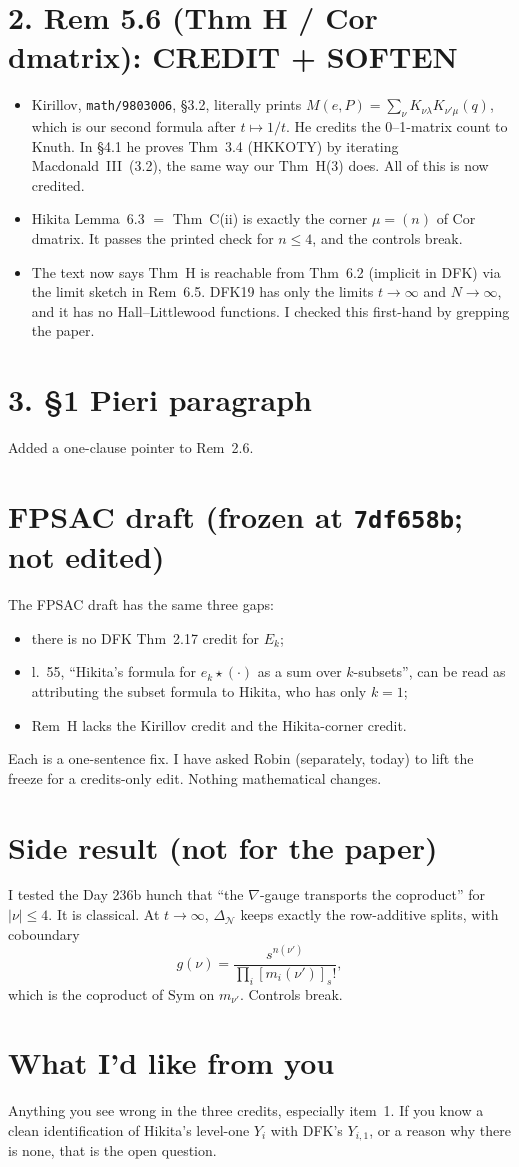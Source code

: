 \documentclass[11pt]{article}
\begin{document}
\section*{2. Rem 5.6 (Thm H / Cor dmatrix): CREDIT + SOFTEN}
\begin{itemize}[leftmargin=1.5em]
\item Kirillov, \texttt{math/9803006}, \S3.2, literally prints
  $M(e,P)=\sum_\nu K_{\nu\lambda}K_{\nu'\mu}(q)$, which is our second formula after $t\mapsto 1/t$.
  He credits the 0--1-matrix count to Knuth. In \S4.1 he proves Thm~3.4 (HKKOTY) by iterating
  Macdonald~III~(3.2), the same way our Thm~H(3) does. All of this is now credited.
\item Hikita Lemma~6.3 $=$ Thm~C(ii) is exactly the corner $\mu=(n)$ of Cor dmatrix. It passes the
  printed check for $n\le 4$, and the controls break.
\item The text now says Thm~H is reachable from Thm~6.2 (implicit in DFK) via the limit
  sketch in Rem~6.5. DFK19 has only the limits $t\to\infty$ and $N\to\infty$, and it has no
  Hall--Littlewood functions. I checked this first-hand by grepping the paper.
\end{itemize}

\section*{3. \S1 Pieri paragraph}
Added a one-clause pointer to Rem~2.6.

\section*{FPSAC draft (frozen at \texttt{7df658b}; not edited)}
The FPSAC draft has the same three gaps:
\begin{itemize}[leftmargin=1.5em]
\item there is no DFK Thm~2.17 credit for $E_k$;
\item l.~55, ``Hikita's formula for $e_k\star(\cdot)$ as a sum over $k$-subsets'', can be read as
  attributing the subset formula to Hikita, who has only $k=1$;
\item Rem~H lacks the Kirillov credit and the Hikita-corner credit.
\end{itemize}
Each is a one-sentence fix. I have asked Robin (separately, today) to lift the freeze for a
credits-only edit. Nothing mathematical changes.

\section*{Side result (not for the paper)}
I tested the Day 236b hunch that ``the $\nabla$-gauge transports the coproduct'' for
$|\nu|\le 4$. It is classical. At $t\to\infty$, $\Delta_{\mathcal N}$ keeps exactly the row-additive
splits, with coboundary
\[
  g(\nu)=\frac{s^{n(\nu')}}{\prod_i [m_i(\nu')]_s!},
\]
which is the coproduct of $\mathrm{Sym}$ on $m_{\nu'}$. Controls break.

\section*{What I'd like from you}
Anything you see wrong in the three credits, especially item~1. If you know a clean
identification of Hikita's level-one $Y_i$ with DFK's $Y_{i,1}$, or a reason why there is none,
that is the open question.
\end{document}
